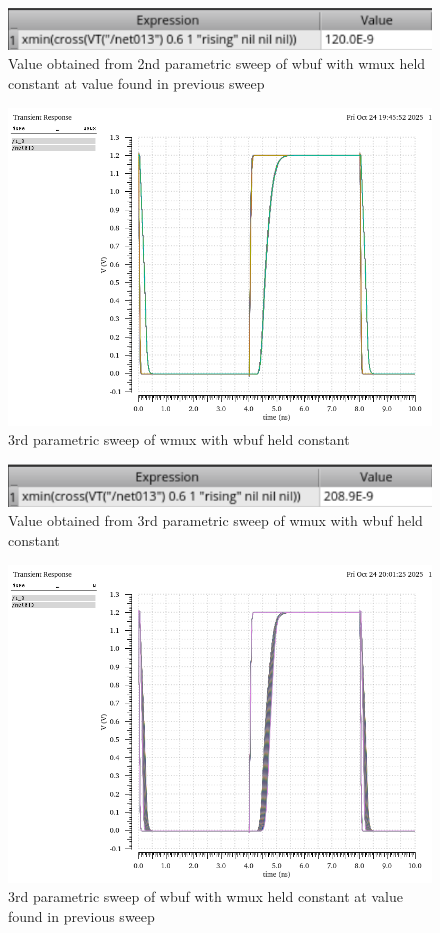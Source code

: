 \documentclass[12pt]{article}
\begin{document}
\begin{figure}[H]
    \centering
    \includegraphics[width=0.5\linewidth]{writeup//figures/wbuf3.png}
    \caption{Value obtained from 2nd parametric sweep of wbuf with wmux held constant at value found in previous sweep}
\end{figure}

\begin{figure}[H]
    \centering
    \includegraphics[width=0.5\linewidth]{writeup//figures/wmux_parametric_sweep4.png}
    \caption{3rd parametric sweep of wmux with wbuf held constant}
\end{figure}

\begin{figure}[H]
    \centering
    \includegraphics[width=0.5\linewidth]{writeup//figures/wmux4.png}
    \caption{Value obtained from 3rd parametric sweep of wmux with wbuf held constant}
\end{figure}

\begin{figure}[H]
    \centering
    \includegraphics[width=0.5\linewidth]{writeup//figures/wbuf_parametric_sweep4.png}
    \caption{3rd parametric sweep of wbuf with wmux held constant at value found in previous sweep}
\end{figure}
\end{document}
